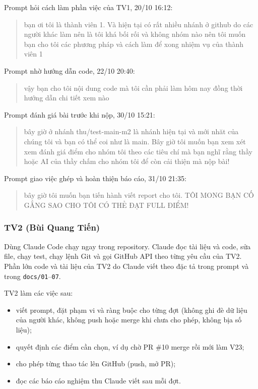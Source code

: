 Prompt hỏi cách làm phần việc của TV1, 20/10 16:12:

\begin{quote}
bạn ơi tôi là thành viên 1. Và hiện tại có rất nhiều nhánh ở github do các người khác làm nên là tôi khá bối rối và không nhóm nào nên tôi muốn bạn cho tôi các phương pháp và cách làm để xong nhiệm vụ của thành viên 1
\end{quote}

Prompt nhờ hướng dẫn code, 22/10 20:40:

\begin{quote}
vậy bạn cho tôi nội dung code mà tôi cần phải làm hôm nay đồng thời hướng dẫn chi tiết xem nào
\end{quote}

Prompt đánh giá bài trước khi nộp, 30/10 15:21:

\begin{quote}
bây giờ ở nhánh thu/test-main-m2 là nhánh hiện tại và mới nhăt của chúng tôi và bạn có thể coi như là main. Bây giờ tôi muốn bạn xem xét xem đánh giá điểm cho nhóm tôi theo các tiêu chí mà bạn nghĩ rằng thầy hoặc AI của thầy chấm cho nhóm tôi để còn cải thiện mà nộp bài!
\end{quote}

Prompt giao việc ghép và hoàn thiện báo cáo, 31/10 21:35:

\begin{quote}
bây giờ tôi muốn bạn tiến hành viết report cho tôi. TÔI MONG BẠN CỐ GẮNG SAO CHO TÔI CÓ THẺ ĐẠT FULL ĐIỂM!
\end{quote}

\subsubsection{TV2 (Bùi Quang Tiến)}

Dùng Claude Code chạy ngay trong repository. Claude đọc tài liệu và code, sửa file, chạy test, chạy lệnh Git và gọi GitHub API theo từng yêu cầu của TV2. Phần lớn code và tài liệu của TV2 do Claude viết theo đặc tả trong prompt và trong \texttt{docs/\allowbreak{}01}--\texttt{07}.

TV2 làm các việc sau:

\begin{itemize}
\tightlist
\item
  viết prompt, đặt phạm vi và ràng buộc cho từng đợt (không ghi đè dữ liệu của người khác, không push hoặc merge khi chưa cho phép, không bịa số liệu);
\item
  quyết định các điểm cần chọn, ví dụ chờ PR \#10 merge rồi mới làm V23;
\item
  cho phép từng thao tác lên GitHub (push, mở PR);
\item
  đọc các báo cáo nghiệm thu Claude viết sau mỗi đợt.
\end{itemize}

